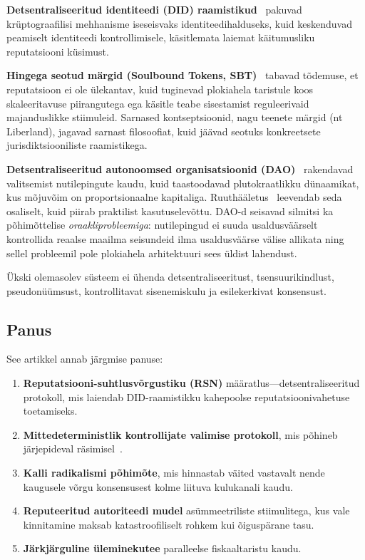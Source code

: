 \documentclass[11pt,a4paper,twocolumn]{article}
\begin{document}
\textbf{Detsentraliseeritud identiteedi (DID) raamistikud}~\cite{did2022} pakuvad krüptograafilisi mehhanisme iseseisvaks identiteedihalduseks, kuid keskenduvad peamiselt identiteedi kontrollimisele, käsitlemata laiemat käitumusliku reputatsiooni küsimust.

\textbf{Hingega seotud märgid (Soulbound Tokens, SBT)}~\cite{weyl2022} tabavad tõdemuse, et reputatsioon ei ole ülekantav, kuid tuginevad plokiahela taristule koos skaleeritavuse piirangutega ega käsitle teabe sisestamist reguleerivaid majanduslikke stiimuleid. Sarnased kontseptsioonid, nagu teenete märgid (nt Liberland), jagavad sarnast filosoofiat, kuid jäävad seotuks konkreetsete jurisdiktsiooniliste raamistikega.

\textbf{Detsentraliseeritud autonoomsed organisatsioonid (DAO)}~\cite{buterin2014} rakendavad valitsemist nutilepingute kaudu, kuid taastoodavad plutokraatlikku dünaamikat, kus mõjuvõim on proportsionaalne kapitaliga. Ruuthääletus~\cite{buterin2019} leevendab seda osaliselt, kuid piirab praktilist kasutuselevõttu. DAO-d seisavad silmitsi ka põhimõttelise \emph{oraakliprobleemiga}: nutilepingud ei suuda usaldusväärselt kontrollida reaalse maailma seisundeid ilma usaldusväärse välise allikata ning sellel probleemil pole plokiahela arhitektuuri sees üldist lahendust.

Ükski olemasolev süsteem ei ühenda detsentraliseeritust, tsensuurikindlust, pseudonüümsust, kontrollitavat sisenemiskulu ja esilekerkivat konsensust.

\subsection{Panus}

See artikkel annab järgmise panuse:
\begin{enumerate}[nosep]
\item \textbf{Reputatsiooni-suhtlusvõrgustiku (RSN)} määratlus---detsentraliseeritud protokoll, mis laiendab DID-raamistikku kahepoolse reputatsioonivahetuse toetamiseks.
\item \textbf{Mittedeterministlik kontrollijate valimise protokoll}, mis põhineb järjepideval räsimisel~\cite{karger1997}.
\item \textbf{Kalli radikalismi põhimõte}, mis hinnastab väited vastavalt nende kaugusele võrgu konsensusest kolme liituva kulukanali kaudu.
\item \textbf{Reputeeritud autoriteedi mudel} asümmeetriliste stiimulitega, kus vale kinnitamine maksab katastroofiliselt rohkem kui õiguspärane tasu.
\item \textbf{Järkjärguline üleminekutee} paralleelse fiskaaltaristu kaudu.
\end{enumerate}
\end{document}
